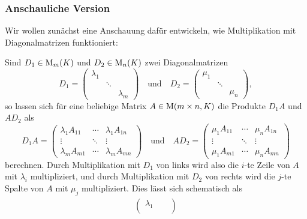 \subsubsection{Anschauliche Version}

Wir wollen zunächst eine Anschauung dafür entwickeln, wie Multiplikation mit Diagonalmatrizen funktioniert:

\begin{observation}
  \label{observation: multiplication with diagonal matrices}
  Sind $D_1 \in \operatorname{M}_{m}(K)$ und $D_2 \in \operatorname{M}_{n}(K)$ zwei Diagonalmatrizen
  \[
      D_1
    = \begin{pmatrix}
        \lambda_1 &         &           \\
                  & \ddots  &           \\
                  &         & \lambda_m 
      \end{pmatrix}
    \quad\text{und}\quad
      D_2
    = \begin{pmatrix}
        \mu_1 &         &       \\
              & \ddots  &       \\
              &         & \mu_n 
      \end{pmatrix},
  \]
  so lassen sich für eine beliebige Matrix $A \in \operatorname{M}(m \times n, K)$ die Produkte $D_1 A$ und $A D_2$ als
  \[
      D_1 A
    = \begin{pmatrix}
        \lambda_1 A_{11}  & \cdots  & \lambda_1 A_{1n}  \\
        \vdots            & \ddots  & \vdots            \\
        \lambda_m A_{m1}  & \cdots  & \lambda_m A_{mn}
      \end{pmatrix}
    \quad\text{und}\quad
      A D_2
    = \begin{pmatrix}
        \mu_1 A_{11}  & \cdots  & \mu_n A_{1n}  \\
        \vdots        & \ddots  & \vdots        \\
        \mu_1 A_{m1}  & \cdots  & \mu_n A_{mn}
      \end{pmatrix}
  \]
  berechnen.
  Durch Multiplikation mit $D_1$ von links wird also die $i$-te Zeile von $A$ mit $\lambda_i$ multipliziert, und durch Multiplikation mit $D_2$ von rechts wird die $j$-te Spalte von $A$ mit $\mu_j$ multipliziert.
  Dies lässt sich schematisch als
  \begin{align*}
        \begin{pmatrix}
          \lambda_1 &         &           \\

\end{pmatrix}
\end{align*}
\end{observation}
